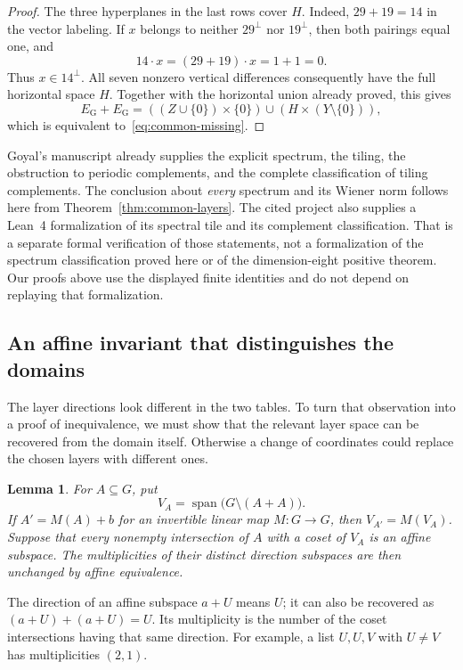 \documentclass[11pt]{article}
\numberwithin{equation}{section}
\newtheorem{lemma}[theorem]{Lemma}
\theoremstyle{definition}
\theoremstyle{remark}\newtheorem{remark}[theorem]{Remark}
\newcommand{\spanof}{\operatorname{span}}
\begin{document}
\begin{proof}
The three hyperplanes in the last rows cover $H$. Indeed, $29+19=14$
in the vector labeling. If $x$ belongs to neither $29^\perp$ nor
$19^\perp$, then both pairings equal one, and
\[
 14\cdot x=(29+19)\cdot x=1+1=0.
\]
Thus $x\in14^\perp$. All seven nonzero vertical differences consequently
have the full horizontal space $H$. Together with the horizontal union
already proved, this gives
\[
 E_{\mathrm G}+E_{\mathrm G}
 =((Z\cup\{0\})\times\{0\})
   \cup(H\times(Y\setminus\{0\})),
\]
which is equivalent to~\eqref{eq:common-missing}.
\end{proof}

Goyal's manuscript already supplies the explicit spectrum, the tiling,
the obstruction to periodic complements, and the complete classification
of tiling complements. The conclusion about \emph{every} spectrum and
its Wiener norm follows here from Theorem~\ref{thm:common-layers}.
The cited project also supplies a Lean~4 formalization of its spectral
tile and its complement classification. That is a separate formal
verification of those statements, not a formalization of the spectrum
classification proved here or of the dimension-eight positive theorem.
Our proofs above use the displayed finite identities and do not depend
on replaying that formalization.

\subsection{An affine invariant that distinguishes the domains}

The layer directions look different in the two tables. To turn that
observation into a proof of inequivalence, we must show that the relevant
layer space can be recovered from the domain itself. Otherwise a change
of coordinates could replace the chosen layers with different ones.

\begin{lemma}\label{lem:intrinsic-layer-space}
For $A\subseteq G$, put
\[
 V_A=\spanof\bigl(G\setminus(A+A)\bigr).
\]
If $A'=M(A)+b$ for an invertible linear map $M:G\to G$, then
$V_{A'}=M(V_A)$. Suppose that every nonempty intersection of $A$ with
a coset of $V_A$ is an affine subspace. The multiplicities of their
distinct direction subspaces are then unchanged by affine equivalence.
\end{lemma}

The direction of an affine subspace $a+U$ means $U$; it can also be
recovered as $(a+U)+(a+U)=U$. Its multiplicity is the number of the
coset intersections having that same direction. For example, a list
$U,U,V$ with $U\ne V$ has multiplicities $(2,1)$.
\end{document}
